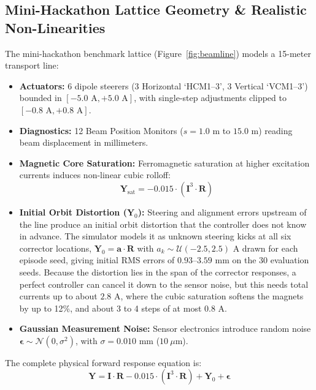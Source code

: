 \documentclass[11pt,a4paper]{article}
\begin{document}
\subsection{Mini-Hackathon Lattice Geometry \& Realistic Non-Linearities}
The mini-hackathon benchmark lattice (Figure~\ref{fig:beamline}) models a 15-meter transport line:
\begin{itemize}
    \item \textbf{Actuators:} 6 dipole steerers (3 Horizontal `HCM1--3', 3 Vertical `VCM1--3') bounded in $[-5.0\text{ A}, +5.0\text{ A}]$, with single-step adjustments clipped to $[-0.8\text{ A}, +0.8\text{ A}]$.
    \item \textbf{Diagnostics:} 12 Beam Position Monitors ($s = 1.0\text{ m}$ to $15.0\text{ m}$) reading beam displacement in millimeters.
    \item \textbf{Magnetic Core Saturation:} Ferromagnetic saturation at higher excitation currents induces non-linear cubic rolloff:
    \begin{equation}
        \mathbf{Y}_{\text{sat}} = - 0.015 \cdot (\mathbf{I}^3 \cdot \mathbf{R})
    \end{equation}
    \item \textbf{Initial Orbit Distortion ($\mathbf{Y}_0$):} Steering and alignment errors upstream of the line produce an initial orbit distortion that the controller does not know in advance. The simulator models it as unknown steering kicks at all six corrector locations, $\mathbf{Y}_0 = \mathbf{a} \cdot \mathbf{R}$ with $a_k \sim \mathcal{U}(-2.5, 2.5)\text{ A}$ drawn for each episode seed, giving initial RMS errors of $0.93$--$3.59\text{ mm}$ on the 30 evaluation seeds. Because the distortion lies in the span of the corrector responses, a perfect controller can cancel it down to the sensor noise, but this needs total currents up to about $2.8\text{ A}$, where the cubic saturation softens the magnets by up to 12\%, and about 3 to 4 steps of at most $0.8\text{ A}$.
    \item \textbf{Gaussian Measurement Noise:} Sensor electronics introduce random noise $\boldsymbol{\epsilon} \sim \mathcal{N}(0, \sigma^2)$, with $\sigma = 0.010\text{ mm}$ ($10\ \mu\text{m}$).
\end{itemize}

The complete physical forward response equation is:
\begin{equation}
    \mathbf{Y} = \mathbf{I} \cdot \mathbf{R} - 0.015 \cdot (\mathbf{I}^3 \cdot \mathbf{R}) + \mathbf{Y}_0 + \boldsymbol{\epsilon}
\end{equation}
\end{document}
